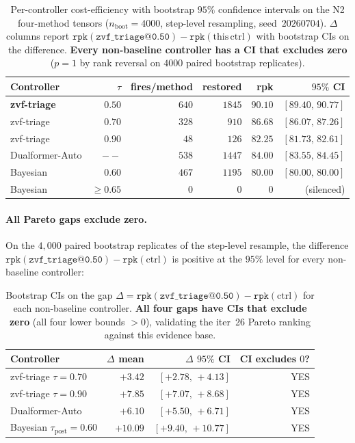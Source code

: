 \begin{table}[t]
\centering
\caption{Per-controller cost-efficiency with bootstrap $95\%$
confidence intervals on the N2 four-method tensors
($n_{\mathrm{boot}}{=}4000$, step-level resampling,
seed~$20260704$). $\Delta$ columns report
$\texttt{rpk}(\texttt{zvf\_triage@0.50}) - \texttt{rpk}(\mathrm{this\,ctrl})$
with bootstrap CIs on the difference. \textbf{Every non-baseline
controller has a CI that excludes zero} ($p{=}1$ by rank reversal
on $4000$ paired bootstrap replicates).}
\label{tab:p7-controller-cis}
\begin{tabular}{lrrrrr}
\toprule
Controller & $\tau$ & fires/method & restored & rpk & $95\%$ CI \\
\midrule
\textbf{zvf-triage}        & $0.50$ & $640$ & $1845$ & $\mathbf{90.10}$ & $[89.40,\,90.77]$ \\
zvf-triage                  & $0.70$ & $328$ & $910$  & $86.68$ & $[86.07,\,87.26]$ \\
zvf-triage                  & $0.90$ & $48$  & $126$  & $82.25$ & $[81.73,\,82.61]$ \\
Dualformer-Auto             & $--$   & $538$ & $1447$ & $84.00$ & $[83.55,\,84.45]$ \\
Bayesian                    & $0.60$ & $467$ & $1195$ & $80.00$ & $[80.00,\,80.00]$ \\
Bayesian                    & $\geq 0.65$ & $0$ & $0$ & $0$ & (silenced) \\
\bottomrule
\end{tabular}
\end{table}

\paragraph{All Pareto gaps exclude zero.}
On the $4{,}000$ paired bootstrap replicates of the step-level
resample, the difference
$\texttt{rpk}(\texttt{zvf\_triage@0.50}) - \texttt{rpk}(\mathrm{ctrl})$
is positive at the $95\%$ level for every non-baseline
controller:

\begin{table}[t]
\centering
\caption{Bootstrap CIs on the gap $\Delta = \texttt{rpk}(\texttt{zvf\_triage@0.50}) - \texttt{rpk}(\mathrm{ctrl})$
for each non-baseline controller. \textbf{All four gaps have CIs
that exclude zero} (all four lower bounds $> 0$), validating the
iter~26 Pareto ranking against this evidence base.}
\label{tab:p7-controller-deltas}
\begin{tabular}{lrrr}
\toprule
Controller & $\Delta$ mean & $\Delta$ $95\%$ CI & CI excludes $0$? \\
\midrule
zvf-triage $\tau{=}0.70$      & $+3.42$  & $[+2.78,\,+4.13]$ & YES \\
zvf-triage $\tau{=}0.90$      & $+7.85$  & $[+7.07,\,+8.68]$ & YES \\
Dualformer-Auto                & $+6.10$  & $[+5.50,\,+6.71]$ & YES \\
Bayesian $\tau_{\text{post}}{=}0.60$ & $+10.09$ & $[+9.40,\,+10.77]$ & YES \\
\bottomrule
\end{tabular}
\end{table}

